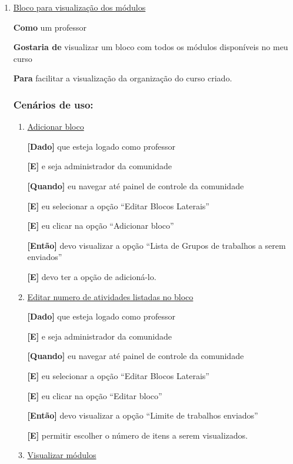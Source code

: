 \begin{enumerate}
\begin{enumerate}
\end{enumerate}

\item \underline{Bloco para visualização dos módulos}

\textbf{Como} um professor

\textbf{Gostaria de} visualizar um bloco com todos os módulos disponíveis no meu curso

\textbf{Para} facilitar a visualização da organização do curso criado.

\subsubsection*{Cenários de uso:}

\begin{enumerate}

\item \underline{Adicionar bloco}

\textbf{[Dado]} que esteja logado como professor

\textbf{[E]} e seja administrador da comunidade

\textbf{[Quando]} eu navegar até painel de controle da comunidade

\textbf{[E]} eu selecionar a opção ``Editar Blocos Laterais''

\textbf{[E]} eu clicar na opção ``Adicionar bloco''

\textbf{[Então]} devo visualizar a opção ``Lista de Grupos de trabalhos a serem enviados''

\textbf{[E]} devo ter a opção de adicioná-lo.

\item \underline{Editar numero de atividades listadas no bloco}

\textbf{[Dado]} que esteja logado como professor

\textbf{[E]} e seja administrador da comunidade

\textbf{[Quando]} eu navegar até painel de controle da comunidade

\textbf{[E]} eu selecionar a opção ``Editar Blocos Laterais''

\textbf{[E]} eu clicar na opção ``Editar bloco''

\textbf{[Então]} devo visualizar a opção ``Limite de trabalhos enviados''

\textbf{[E]} permitir escolher o número de itens a serem visualizados.

\item \underline{Visualizar módulos}


\end{enumerate}
\end{enumerate}
